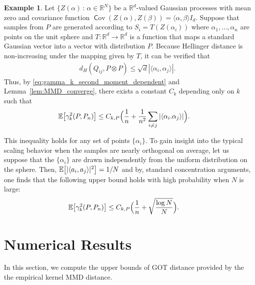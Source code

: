 \documentclass{article}
\theoremstyle{definition}
\newtheorem{example}{Example}
\newcommand{\reals}{\mathbb{R}}
\newcommand{\bEx}{\ensuremath{\mathbb{E}}}
\newcommand{\ex}[1]{\ensuremath{\mathbb{E}\left[ #1\right]}}
\DeclareMathOperator{\cov}{\mathsf Cov}
\let\originalleft\left
\let\originalright\right
\renewcommand{\left}{\mathopen{}\mathclose\bgroup\originalleft}
\renewcommand{\right}{\aftergroup\egroup\originalright}
\begin{document}
\begin{example}\label{eg:dependent-sphere}
Let $\{  Z(\alpha)\, : \, \alpha \in \reals^N \}$ be a $\reals^d$-valued Gaussian processes with mean zero and covariance function $\cov(Z(\alpha), Z(\beta)) =\langle \alpha, \beta  \rangle I_d$. Suppose that samples from $P$ are generated according to $S_i = T(  Z(\alpha_i))$ where  $\alpha_1 ,\dots, \alpha_n$ are points on the unit sphere and $T \colon \reals^d \to \reals^d$ is a function that maps a standard Gaussian vector into a vector with distribution $P$. Because Hellinger distance is non-increasing under the mapping given by $T$, it can be verified that
\begin{align*}
    d_H(Q_{ij}, P \otimes P  ) \le \sqrt{d} | \langle \alpha_i, \alpha_j\rangle|.
\end{align*}
Thus, by \eqref{eq:gamma_k_second_moment_dependent} and Lemma~\ref{lem:MMD_converge}, there exists a constant $C_k$ depending only on $k$ such that
\begin{align}\label{eq:ES-gammak2-sphere-1}
  \bEx \left[ \gamma^2_k(P, P_n)  \right] &  \le C_{k,P} \Big( \frac{1}{n} +   \frac{ 1}{n^2} \sum_{i \ne j} | \langle \alpha_i. \alpha_j\rangle|\Big).
\end{align}

This inequality holds for any set of points $\{\alpha_i\}$. To gain insight into the typical scaling behavior when the samples are nearly orthogonal on average, let us suppose that the $\{\alpha_i\}$ are drawn  independently from the uniform distribution on the sphere. Then, $\ex{ |\langle a_i, a_j \rangle|^2} = 1/N$ and by, standard concentration arguments, one finds that the following upper bound holds with high probability when $N$ is large: 
\begin{align}\label{eq:ES-gammak2-sphere-2}
  \bEx \left[ \gamma^2_k(P, P_n)  \right]  &  \le C_{k,P}\Big( \frac{1}{n} +    \sqrt{ \frac{ \log N}{N}} \Big).
\end{align}
\end{example}


\section{Numerical Results} 


In this section, we compute the upper bounds of GOT distance provided by the the empirical kernel MMD distance.%
\end{document}
